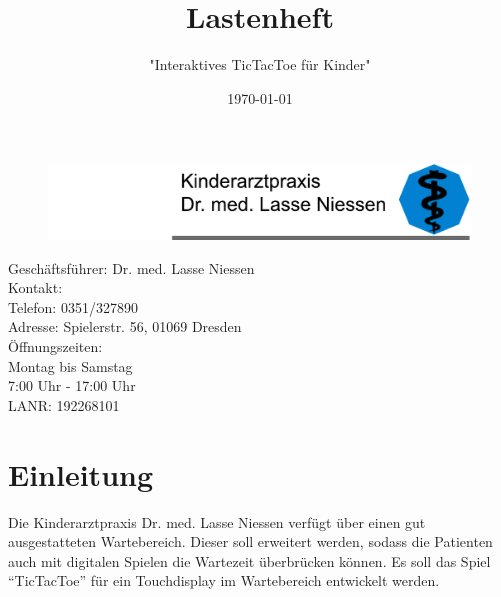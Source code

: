 \documentclass[12pt]{article}
\title{\textbf{Lastenheft}}
\author{"Interaktives \Gls{TicTacToe} für Kinder"}
\date{\today} %
\begin{document}
\begin{titlepage}
	\centering	
	\begin{figure}
	\includegraphics[scale=0.9]{banner.pdf} %
	\end{figure}
	\maketitle
	\thispagestyle{empty}
	
	\vspace*{10cm}	
	
	\begin{flushleft}
	Geschäftsführer: \hspace*{1mm} Dr. med. Lasse Niessen\\
	Kontakt:\\
		\hspace*{1cm} Telefon: \hspace*{5mm} 0351/327890\\
		\hspace*{1cm} Adresse: \hspace*{4mm} Spielerstr. 56, 01069 Dresden\\
	
	Öffnungszeiten:\\
		\hspace*{3.2cm} Montag bis Samstag\\
		\hspace*{3.2cm} 7:00 Uhr - 17:00 Uhr\\
	LANR: \hspace*{1.75cm} 192268101	
	\end{flushleft}
	
	\newpage \thispagestyle{empty} \tableofcontents 
\end{titlepage}
	
	

\setcounter{page}{3}
\section{Einleitung}
Die Kinderarztpraxis Dr. med. Lasse Niessen verfügt über einen gut ausgestatteten Wartebereich. Dieser soll erweitert werden, sodass die Patienten auch mit digitalen Spielen die Wartezeit überbrücken können. Es soll das Spiel "`\Gls{TicTacToe}"' für ein Touchdisplay im Wartebereich entwickelt werden.
\end{document}
